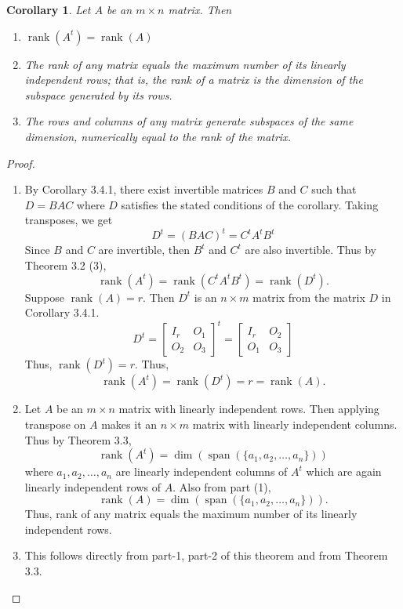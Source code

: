 \documentclass[12pt, a4paper]{article}
\newtheorem{corollary}{Corollary}[theorem]
\theoremstyle{definition}
\theoremstyle{remark}
\DeclareMathOperator{\Span}{span}
\DeclareMathOperator{\rank}{rank}
\begin{document}
\begin{corollary}
Let $A$ be an $m \times n$ matrix. Then
\begin{enumerate}
    \item $\rank(A^t) = \rank(A)$
    \item The rank of any matrix equals the maximum number of its linearly independent rows; that is, the rank of a matrix is the dimension of the subspace generated by its rows.
    \item The rows and columns of any matrix generate subspaces of the same dimension, numerically equal to the rank of the matrix.
\end{enumerate}
\end{corollary}

\begin{proof}
\begin{enumerate}
    \item By Corollary 3.4.1, there exist invertible matrices $B$ and $C$ such that $D = BAC$ where $D$ satisfies the stated conditions of the corollary. Taking transposes, we get
    \[
    D^t = (BAC)^t = C^t A^t B^t
    \]
    Since $B$ and $C$ are invertible, then $B^t$ and $C^t$ are also invertible. Thus by Theorem 3.2 (3),
    \[
    \rank(A^t) = \rank(C^t A^t B^t) = \rank(D^t).
    \]
    Suppose $\rank(A) = r$. Then $D^t$ is an $n \times m$ matrix from the matrix $D$ in Corollary 3.4.1.
    \[
    D^t = \begin{bmatrix} I_r & O_1 \\ O_2 & O_3 \end{bmatrix}^t = \begin{bmatrix} I_r & O_2 \\ O_1 & O_3 \end{bmatrix}
    \]
    Thus, $\rank(D^t) = r$. Thus,
    \[
    \rank(A^t) = \rank(D^t) = r = \rank(A).
    \]

    \item Let $A$ be an $m \times n$ matrix with linearly independent rows. Then applying transpose on $A$ makes it an $n \times m$ matrix with linearly independent columns. Thus by Theorem 3.3,
    \[
    \rank(A^t) = \dim(\Span(\{a_1, a_2, \dots, a_n\}))
    \]
    where $a_1, a_2, \dots, a_n$ are linearly independent columns of $A^t$ which are again linearly independent rows of $A$. Also from part (1),
    \[
    \rank(A) = \dim(\Span(\{a_1, a_2, \dots, a_n\})).
    \]
    Thus, rank of any matrix equals the maximum number of its linearly independent rows.

    \item This follows directly from part-1, part-2 of this theorem and from Theorem 3.3.
\end{enumerate}
\end{proof}
\end{document}
